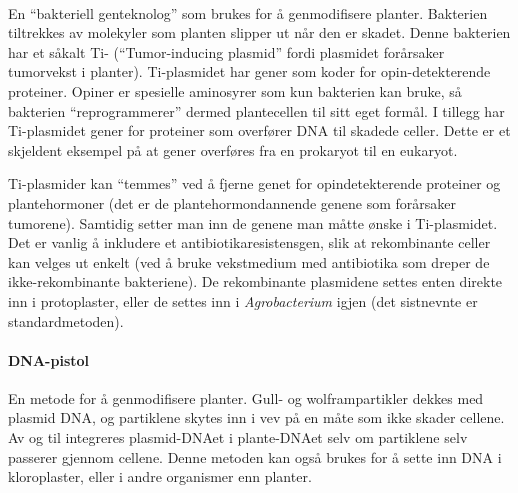 \paragraph{} En ``bakteriell genteknolog'' som brukes for å genmodifisere planter. Bakterien tiltrekkes av molekyler som planten slipper ut når den er skadet. Denne bakterien har et såkalt Ti- (``Tumor-inducing plasmid'' fordi plasmidet forårsaker tumorvekst i planter). Ti-plasmidet har gener som koder for opin-detekterende proteiner. Opiner er spesielle aminosyrer som kun bakterien kan bruke, så bakterien ``reprogrammerer'' dermed plantecellen til sitt eget formål. I tillegg har Ti-plasmidet gener for proteiner som overfører DNA til skadede celler. Dette er et skjeldent eksempel på at gener overføres fra en prokaryot til en eukaryot. 

Ti-plasmider kan ``temmes'' ved å fjerne genet for opindetekterende proteiner og plantehormoner (det er de plantehormondannende genene som forårsaker tumorene). Samtidig setter man inn de genene man måtte ønske i Ti-plasmidet. Det er vanlig å inkludere et antibiotikaresistensgen, slik at rekombinante celler kan velges ut enkelt (ved å bruke vekstmedium med antibiotika som dreper de ikke-rekombinante bakteriene). De rekombinante plasmidene settes enten direkte inn i protoplaster, eller de settes inn i \emph{Agrobacterium} igjen (det sistnevnte er standardmetoden).

\paragraph{DNA-pistol} En metode for å genmodifisere planter. Gull- og wolframpartikler dekkes med plasmid DNA, og partiklene skytes inn i vev på en måte som ikke skader cellene. Av og til integreres plasmid-DNAet i plante-DNAet selv om partiklene selv passerer gjennom cellene. Denne metoden kan også brukes for å sette inn DNA i kloroplaster, eller i andre organismer enn planter.

